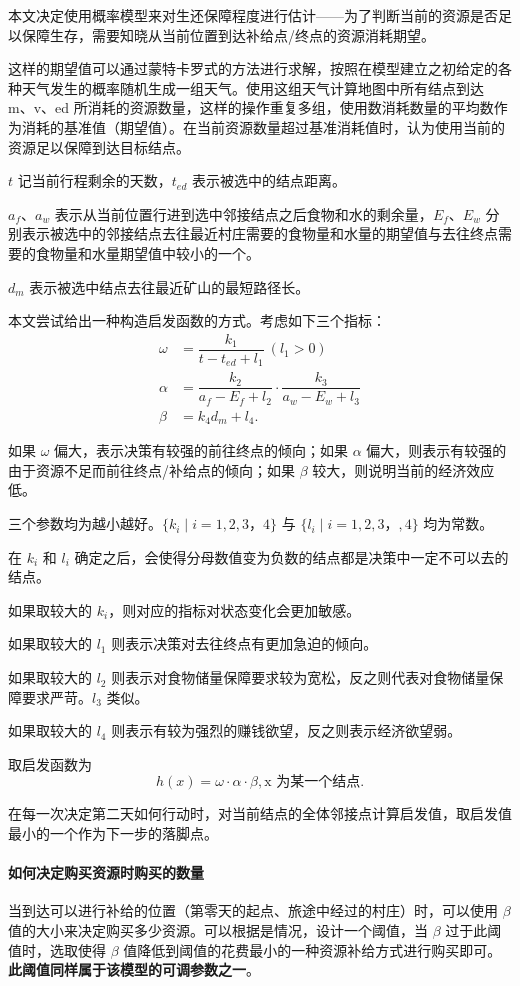 \documentclass[a4paper]{ctexart}
\begin{document}
本文决定使用概率模型来对生还保障程度进行估计——为了判断当前的资源是否足以保障生存，需要知晓从当前位置到达补给点/终点的资源消耗期望。

这样的期望值可以通过蒙特卡罗式的方法进行求解，按照在模型建立之初给定的各种天气发生的概率随机生成一组天气。使用这组天气计算地图中所有结点到达 m、v、ed 所消耗的资源数量，这样的操作重复多组，使用数消耗数量的平均数作为消耗的基准值（期望值）。在当前资源数量超过基准消耗值时，认为使用当前的资源足以保障到达目标结点。

$t$ 记当前行程剩余的天数，$t_{ed}$ 表示被选中的结点距离。

$a_f$、$a_w$ 表示从当前位置行进到选中邻接结点之后食物和水的剩余量，$E_f$、$E_w$ 分别表示被选中的邻接结点去往最近村庄需要的食物量和水量的期望值与去往终点需要的食物量和水量期望值中较小的一个。

$d_m$ 表示被选中结点去往最近矿山的最短路径长。

本文尝试给出一种构造启发函数的方式。考虑如下三个指标：
\begin{align*}
    \omega &= \dfrac{k_1}{t - t_{ed} + l_1}\ (l_1 > 0)\\
    \alpha &= \dfrac{k_2}{a_f - E_f + l_2} \cdot \dfrac{k_3}{a_w - E_w + l_3}\\
    \beta &= k_4 d_m + l_4
.\end{align*}

如果 $\omega$ 偏大，表示决策有较强的前往终点的倾向；如果 $\alpha$ 偏大，则表示有较强的由于资源不足而前往终点/补给点的倾向；如果 $\beta$ 较大，则说明当前的经济效应低。

三个参数均为越小越好。$\{k_i \mid i = 1, 2, 3， 4\}$ 与 $\{l_i \mid i = 1, 2, 3，, 4\}$ 均为常数。

在 $k_i$ 和 $l_i$ 确定之后，会使得分母数值变为负数的结点都是决策中一定不可以去的结点。

如果取较大的 $k_i$，则对应的指标对状态变化会更加敏感。

如果取较大的 $l_1$ 则表示决策对去往终点有更加急迫的倾向。

如果取较大的 $l_2$ 则表示对食物储量保障要求较为宽松，反之则代表对食物储量保障要求严苛。$l_3$ 类似。

如果取较大的 $l_4$ 则表示有较为强烈的赚钱欲望，反之则表示经济欲望弱。

取启发函数为 \[
    h(x) = \omega \cdot \alpha \cdot \beta, \text{x 为某一个结点}
.\]

在每一次决定第二天如何行动时，对当前结点的全体邻接点计算启发值，取启发值最小的一个作为下一步的落脚点。

\paragraph{如何决定购买资源时购买的数量} 当到达可以进行补给的位置（第零天的起点、旅途中经过的村庄）时，可以使用 $\beta$ 值的大小来决定购买多少资源。可以根据是情况，设计一个阈值，当 $\beta$ 过于此阈值时，选取使得 $\beta$ 值降低到阈值的花费最小的一种资源补给方式进行购买即可。\textbf{此阈值同样属于该模型的可调参数之一}。
\end{document}
